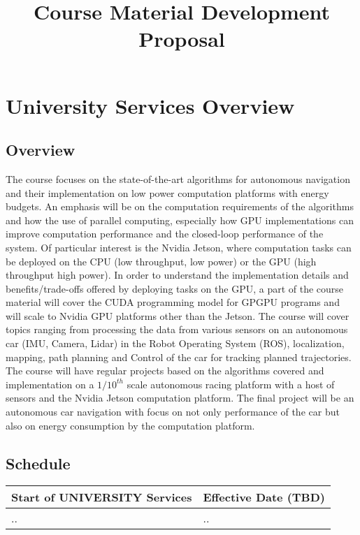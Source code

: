 \documentclass{article}[14pt]
\title{Course Material Development Proposal}
\begin{document}
\maketitle
\section{University Services Overview}
\subsection{Overview}

The course focuses on the state-of-the-art algorithms for autonomous navigation and their implementation on low power computation platforms with energy budgets. An emphasis will be on the computation requirements of the algorithms and how the use of parallel computing, especially how GPU implementations can improve computation performance and the closed-loop performance of the system. Of particular interest is the Nvidia Jetson, where computation tasks can be deployed on the CPU (low throughput, low power) or the GPU (high throughput high power). In order to understand the implementation details and benefits/trade-offs offered by deploying tasks on the GPU, a part of the course material will cover the CUDA programming model for GPGPU programs and will scale to Nvidia GPU platforms other than the Jetson. The course will cover topics ranging from processing the data from various sensors on an autonomous car (IMU, Camera, Lidar) in the Robot Operating System (ROS), localization, mapping, path planning and Control of the car for tracking planned trajectories.  The course will have regular projects based on the algorithms covered and implementation on a $1/10^{th}$ scale autonomous racing platform with a host of sensors and the Nvidia Jetson computation platform. The final project will be an autonomous car navigation with focus on not only performance of the car but also on energy consumption by the computation platform.
\subsection{Schedule}

\begin{center}
\begin{tabular}{ | l | l |}
\hline
Start of UNIVERSITY Services & Effective Date (TBD) \\
\hline
.. & .. \\
\hline
\end{tabular}
\end{center}
\end{document}
